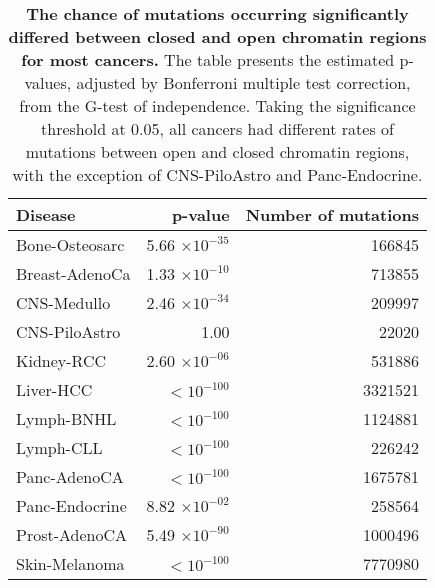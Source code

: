 \vspace{0.2cm}
\begin{table}[h]
\centering
\caption{\textbf{The chance of mutations occurring significantly differed between closed and open chromatin regions for most cancers.} The table presents the estimated p-values, adjusted by Bonferroni multiple test correction, from the G-test of independence. Taking the significance threshold at 0.05, all cancers had different rates of mutations between open and closed chromatin regions, with the exception of CNS-PiloAstro and Panc-Endocrine.}
\label{tab:g-test}
\begin{tabular}{lrr}
  \toprule
 \textbf{Disease} & \textbf{p-value} & \textbf{Number of mutations} \\ 
  \hline
 Bone-Osteosarc & 5.66 $\times 10^{-35}$ & 166845 \\ 
 Breast-AdenoCa & 1.33 $\times 10^{-10}$ & 713855 \\ 
 CNS-Medullo & 2.46 $\times 10^{-34}$ & 209997 \\ 
 CNS-PiloAstro & 1.00 & 22020 \\ 
 Kidney-RCC & 2.60 $\times 10^{-06}$ & 531886 \\ 
 Liver-HCC & $<10^{-100}$ & 3321521 \\ 
 Lymph-BNHL & $<10^{-100}$ & 1124881 \\ 
 Lymph-CLL & $<10^{-100}$ & 226242 \\ 
 Panc-AdenoCA & $<10^{-100}$ & 1675781 \\ 
 Panc-Endocrine & 8.82 $\times 10^{-02}$ & 258564 \\ 
 Prost-AdenoCA & 5.49 $\times 10^{-90}$ & 1000496 \\ 
 Skin-Melanoma & $<10^{-100}$ & 7770980 \\ 
   \bottomrule
\end{tabular}
\end{table}